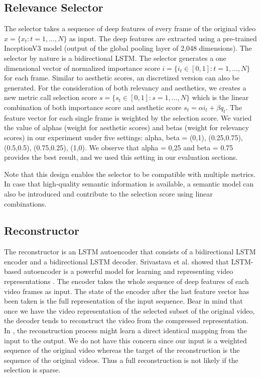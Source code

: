 \documentclass[5pt]{article}
\begin{document}
\subsection{Relevance Selector}
The selector takes a sequence of deep features of every frame of the original video $x = \{x_t: t = 1,...,N\}$ as input. The deep features are extracted using a pre-trained InceptionV3 model (output of the global pooling layer of 2,048 dimensions). The selector by nature is a bidirectional LSTM. The selector generates a one dimensional vector of normalized importance score $i = \{i_t \in [0,1]: t = 1,...,N\}$ for each frame. Similar to aesthetic scores, an discretized version can also be generated. For the consideration of both relevancy and aesthetics, we creates a new metric call selection score $s = \{s_t \in [0,1]:  s = 1,...,N\}$ which is the linear combination of both importance score and aesthetic score $s_t = \alpha i_{t} + \beta q_{t}$. The feature vector for each single frame is weighted by the selection score. We varied the value of alphas (weight for aesthetic scores) and betas (weight for relevancy scores) in our experiment under five settings: alpha, beta = {(0,1), (0.25,0.75), (0.5,0.5), (0.75,0.25), (1,0)}. We observe that alpha = 0,25 and beta = 0.75 provides the best result, and we used this setting in our evaluation sections.

Note that this design enables the selector to be compatible with multiple metrics. In case that high-quality semantic information is available, a semantic model can also be introduced and contribute to the selection score using linear combinations.

\subsection{Reconstructor}
The reconstructor is an LSTM autoencoder that consists of a bidirectional LSTM encoder and a bidirectional LSTM decoder. Srivastava et al. showed that LSTM-based autoencoder is a powerful model for learning and representing video representations \cite{srivastava2015unsupervised}.  The encoder takes the whole sequence of deep features of each video frames as input. The state of the encoder after the last feature vector has been taken is the full representation of the input sequence. Bear in mind that once we have the video representation of the selected subset of the original video, the decoder tends to reconstruct the video from the compressed representation. In \cite{srivastava2015unsupervised}, the reconstruction process might learn a direct identical mapping from the input to the output. We do not have this concern since our input is a weighted sequence of the original video whereas the target of the reconstruction is the sequence of the original videos. Thus a full reconstruction is not likely if the selection is sparse.
\end{document}
